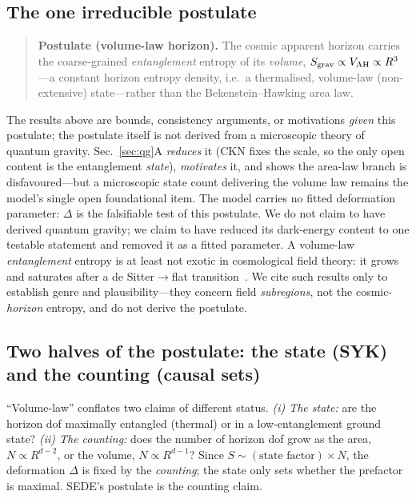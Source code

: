 \subsection{The one irreducible postulate}
\begin{quote}
\textbf{Postulate (volume-law horizon).} The cosmic apparent horizon carries the coarse-grained
\emph{entanglement} entropy of its \emph{volume}, $S_{\rm grav}\propto V_{\mathrm{AH}}\propto R^3$---a constant
horizon entropy density, i.e.\ a thermalised, volume-law (non-extensive) state---rather than the
Bekenstein--Hawking area law.
\end{quote}
The results above are bounds, consistency arguments, or motivations \emph{given} this postulate; the
postulate itself is not derived from a microscopic theory of quantum gravity. Sec.~\ref{sec:qg}A
\emph{reduces} it (CKN fixes the scale, so the only open content is the entanglement \emph{state}),
\emph{motivates} it, and shows the area-law branch is disfavoured---but a microscopic state count
delivering the volume law remains the model's single open foundational item. The model carries no
fitted deformation parameter: $\Delta$ is the falsifiable test of this postulate. We do not claim to
have derived quantum gravity; we claim to have reduced its dark-energy content to one testable statement
and removed it as a fitted parameter. A volume-law \emph{entanglement} entropy is at least not exotic in
cosmological field theory: it grows and saturates after a de Sitter$\to$flat
transition~\cite{Khlebnikov:2019wbk}. We cite such results only to establish genre and plausibility---they
concern field \emph{subregions}, not the cosmic-\emph{horizon} entropy, and do not derive the postulate.

\subsection{Two halves of the postulate: the state (SYK) and the counting (causal sets)}
``Volume-law'' conflates two claims of different status. \emph{(i) The state:} are the horizon dof
maximally entangled (thermal) or in a low-entanglement ground state? \emph{(ii) The counting:} does the
number of horizon dof grow as the area, $N\propto R^{d-2}$, or the volume, $N\propto R^{d-1}$? Since
$S\sim(\text{state factor})\times N$, the deformation $\Delta$ is fixed by the \emph{counting}; the state
only sets whether the prefactor is maximal. SEDE's postulate is the counting claim.

